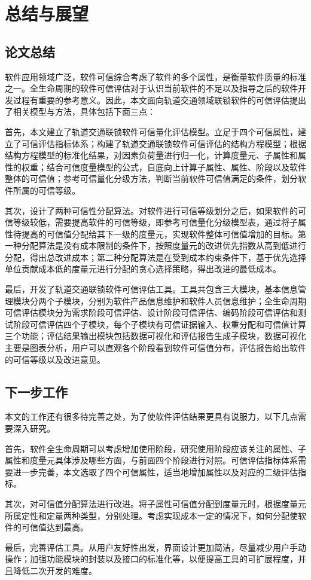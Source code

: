 \chapter{总结与展望}

\section{论文总结}
软件应用领域广泛，软件可信综合考虑了软件的多个属性，是衡量软件质量的标准之一。全生命周期的软件可信评估对于认识当前软件的不足以及指导之后的软件开发过程有重要的参考意义。因此，本文面向轨道交通领域联锁软件的可信评估提出了相关模型与方法，具体包括下面三点：

首先，本文建立了轨道交通联锁软件可信量化评估模型。立足于四个可信属性，建立了可信评估指标体系；构建了轨道交通联锁软件可信评估的结构方程模型；根据结构方程模型的标准化结果，对因素负荷量进行归一化，计算度量元、子属性和属性的权重；结合可信度量模型的公式，自底向上计算子属性、属性、阶段以及软件整体的可信值；参考可信量化分级方法，判断当前软件可信值满足的条件，划分软件所属的可信等级。

其次，设计了两种可信性分配算法。对软件进行可信等级划分之后，如果软件的可信等级较低，需要提高软件的可信等级，即参考可信量化分级模型表，通过将子属性待提高的可信值分配给其下一级的度量元，实现软件整体可信值增加的目标。第一种分配算法是没有成本限制的条件下，按照度量元的改进优先指数从高到低进行分配，得出总改进成本；第二种分配算法是在受到成本约束条件下，基于优先选择单位贡献成本低的度量元进行分配的贪心选择策略，得出改进的最低成本。

最后，开发了轨道交通联锁软件可信评估工具。工具共包含三大模块，基本信息管理模块分两个子模块，分别为软件产品信息维护和软件人员信息维护；全生命周期可信评估模块分为需求阶段可信评估、设计阶段可信评估、编码阶段可信评估和测试阶段可信评估四个子模块，每个子模块有可信证据输入、权重分配和可信值计算三个功能；评估结果输出模块包括数据可视化和评估报告生成子模块，数据可视化主要是图表分析，用户可以直观各个阶段看到软件可信值分布，评估报告给出软件的可信等级以及改进意见。


\section{下一步工作}
本文的工作还有很多待完善之处，为了使软件评估结果更具有说服力，以下几点需要深入研究。

首先，软件全生命周期可以考虑增加使用阶段，研究使用阶段应该关注的属性、子属性和度量元具体涉及哪些方面，与前面四个阶段进行对照。可信评估指标体系需要进一步完善，本文选取了四个可信属性，适当地增加属性以及对应的二级评估指标。

其次，对可信值分配算法进行改进。将子属性可信值分配到度量元时，根据度量元所属定性和定量两种类型，分别处理。考虑实现成本一定的情况下，如何分配使软件的可信值达到最高。

最后，完善评估工具。从用户友好性出发，界面设计更加简洁，尽量减少用户手动操作；加强功能模块的封装以及接口的标准化等，以便提高工具的可扩展程度，并且降低二次开发的难度。




